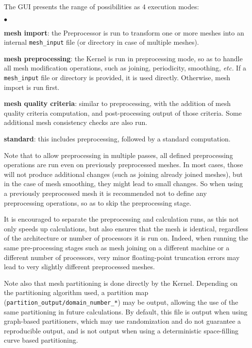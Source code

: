 {{{The GUI presents the range of possibilities as 4 execution modes:

\begin{list}{$\bullet$}{}

\item {\bf mesh import}: the Preprocessor is run to transform one or more meshes into an internal \texttt{mesh\_input} file (or directory in case of multiple meshes).

\item {\bf mesh preprocessing}: the Kernel is run in preprocessing mode, so as to handle all mesh modification operations, such as joining, periodicity, smoothing, \emph{etc.} If a \texttt{mesh\_input} file or directory is provided, it is used directly. Otherwise, mesh import is run first.

\item {\bf mesh quality criteria}: similar to preprocessing, with the addition of mesh quality criteria computation, and post-processing output of those criteria. Some additional mesh consistency checks are also run.

\item {\bf standard}: this includes preprocessing, followed by a standard computation.

\end{list}

Note that to allow preprocessing in multiple passes, all defined preprocessing operations are run even on previously preprocessed meshes. In most cases, those will not produce additional changes (such as joining already joined meshes), but in the case of mesh smoothing, they might lead to small changes. So when using a previously preprocessed mesh it is recommended
not to define any preprocessing operations, so as to skip the preprocessing stage.

It is encouraged to separate the preprocessing and calculation runs, as
this not only speeds up calculations, but also ensures that the mesh is identical, regardless of the architecture or number of processors it is run on. Indeed, when running the same pre-processing stages such as mesh joining on a different machine or a different number of processors, very minor floating-point truncation errors may lead to very slightly different preprocessed meshes.

Note also that mesh partitioning is done directly by the Kernel.
Depending on the partitioning algorithm used, a partition map
(\texttt{partition\_output/domain\_number\_*}) may be output,
allowing the use of the same partitioning in future calculations.
By default, this file is output when using graph-based partitioners, which may
use randomization and do not guarantee a reproducible output, and is not output
when using a deterministic space-filling curve based partitioning.

}}}
